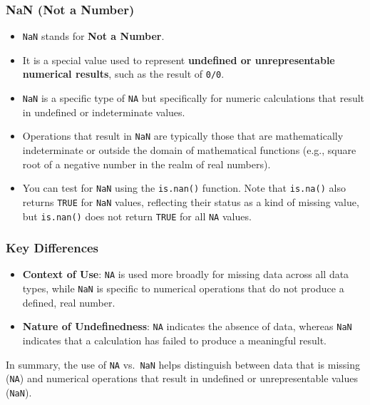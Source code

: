 \documentclass[
]{book}
\providecommand{\tightlist}{%
  \setlength{\itemsep}{0pt}\setlength{\parskip}{0pt}}
\begin{document}
\subsubsection{NaN (Not a Number)}\label{nan-not-a-number}

\begin{itemize}
\tightlist
\item
  \texttt{NaN} stands for \textbf{Not a Number}.
\item
  It is a special value used to represent \textbf{undefined or
  unrepresentable numerical results}, such as the result of \texttt{0/0}.
\item
  \texttt{NaN} is a specific type of \texttt{NA} but specifically for numeric
  calculations that result in undefined or indeterminate values.
\item
  Operations that result in \texttt{NaN} are typically those that are
  mathematically indeterminate or outside the domain of mathematical
  functions (e.g., square root of a negative number in the realm of
  real numbers).
\item
  You can test for \texttt{NaN} using the \texttt{is.nan()} function. Note that
  \texttt{is.na()} also returns \texttt{TRUE} for \texttt{NaN} values, reflecting their
  status as a kind of missing value, but \texttt{is.nan()} does not return
  \texttt{TRUE} for all \texttt{NA} values.
\end{itemize}

\subsubsection*{Key Differences}\label{key-differences}

\begin{itemize}
\tightlist
\item
  \textbf{Context of Use}: \texttt{NA} is used more broadly for missing data
  across all data types, while \texttt{NaN} is specific to numerical
  operations that do not produce a defined, real number.
\item
  \textbf{Nature of Undefinedness}: \texttt{NA} indicates the absence of data,
  whereas \texttt{NaN} indicates that a calculation has failed to produce a
  meaningful result.
\end{itemize}

In summary, the use of \texttt{NA} vs.~\texttt{NaN} helps distinguish between data
that is missing (\texttt{NA}) and numerical operations that result in undefined
or unrepresentable values (\texttt{NaN}).
\end{document}
